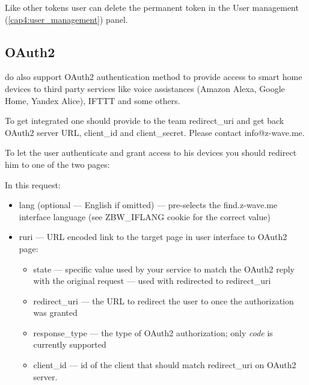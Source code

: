 Like other tokens user can delete the permanent token in the User management (\ref{cap4:user_management}) panel.

\subsection{OAuth2}
\label{cap:authentication_oauth2}

\zway do also support OAuth2 authentication method to provide access to smart home devices to third party services like voice assistances (Amazon Alexa, Google Home, Yandex Alice), IFTTT and some others.

To get integrated one should provide to the \zwaveme team redirect\_uri and get back OAuth2 server URL, client\_id and client\_secret. Please contact info@z-wave.me.

To let the user authenticate and grant access to his devices you should redirect him to one of the two pages:

In this request:
\begin{itemize}
\item lang (optional --- English if omitted) — pre-selects the find.z-wave.me interface language (see ZBW\_IFLANG cookie for the correct value)
\item ruri --- URL encoded link to the target page in \zway user interface to OAuth2 page:
\begin{itemize}
	\item state --- specific value used by your service to match the OAuth2 reply with the original request --- used with redirected to redirect\_uri
	\item redirect\_uri --- the URL to redirect the user to once the authorization was granted
	\item response\_type --- the type of OAuth2 authorization; only \textit{code} is currently supported
	\item client\_id --- id of the client that should match redirect\_uri on \zwaveme OAuth2 server.
\end{itemize}
\end{itemize}

